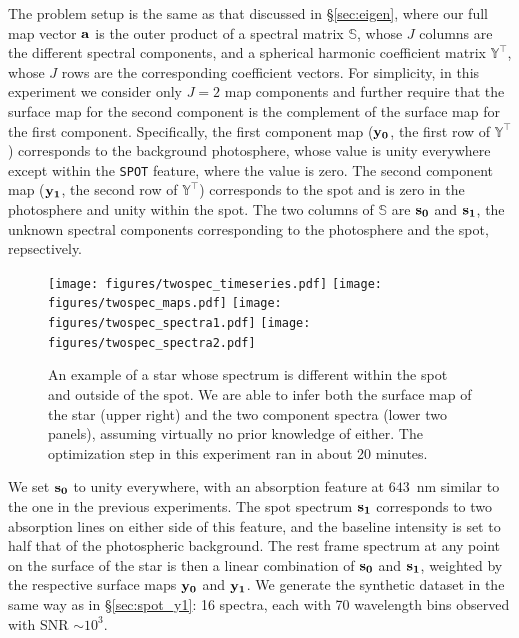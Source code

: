 \documentclass[modern]{aastex631}
\def\timeInferTwoSpec{about 20 minutes}
\begin{document}
The problem setup is the same as that discussed in \S\ref{sec:eigen}, where our full map vector ${\mathbf{a}}$ is the outer product of a spectral matrix $\mathbb{S}$, whose $J$ columns are the different spectral components, and a spherical harmonic coefficient matrix $\mathbb{Y}^\top$, whose $J$ rows are the corresponding coefficient vectors. 
For simplicity, in this experiment we consider only $J = 2$ map components and further require that the surface map for the second component is the complement of the surface map for the first component.
Specifically, the first component map (${\mathbf{y_0}}$, the first row of $\mathbb{Y}^\top$) corresponds to the background photosphere, whose value is unity everywhere except within the \texttt{SPOT} feature, where the value is zero.
The second component map (${\mathbf{y_1}}$, the second row of $\mathbb{Y}^\top$) corresponds to the spot and is zero in the photosphere and unity within the spot.
The two columns of $\mathbb{S}$ are ${\mathbf{s_0}}$ and ${\mathbf{s_1}}$, the unknown spectral components corresponding to the photosphere and the spot, repsectively.
%
\begin{figure}[p!]
    \begin{centering}
        \texttt{[image: figures/twospec\_timeseries.pdf]}
        \texttt{[image: figures/twospec\_maps.pdf]}
        \texttt{[image: figures/twospec\_spectra1.pdf]}
        \texttt{[image: figures/twospec\_spectra2.pdf]}
        \caption{%
            An example of a star whose spectrum is different within the spot and outside of the spot.
            We are able to infer both the surface map of the star (upper right) and the two component spectra (lower two panels), assuming virtually no prior knowledge of either.
            The optimization step in this experiment ran in \timeInferTwoSpec.
        }
        \label{fig:twospec}
    \end{centering}
\end{figure}
%
We set ${\mathbf{s_0}}$ to unity everywhere, with an absorption feature at $643$~nm similar to the one in the previous experiments.
The spot spectrum ${\mathbf{s_1}}$ corresponds to two absorption lines on either side of this feature, and the baseline intensity is set to half that of the photospheric background.
%
The rest frame spectrum at any point on the surface of the star is then a linear combination of ${\mathbf{s_0}}$ and ${\mathbf{s_1}}$, weighted by the respective surface maps ${\mathbf{y_0}}$ and ${\mathbf{y_1}}$.
%
We generate the synthetic dataset in the same way as in \S\ref{sec:spot_y1}: 16 spectra, each with 70 wavelength bins observed with SNR $\sim 10^{3}$.
\end{document}
